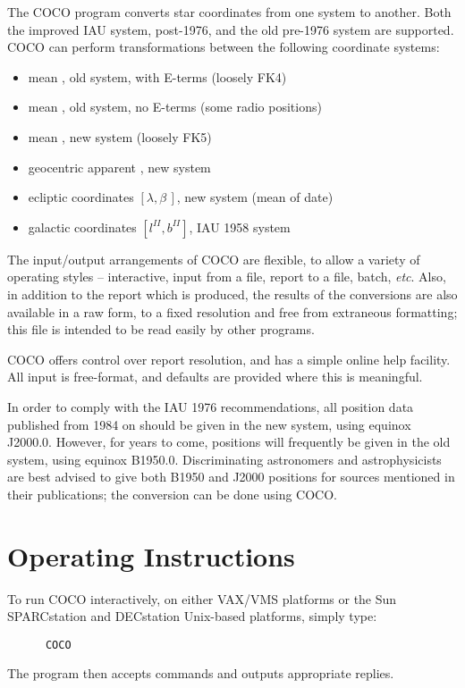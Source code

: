 The COCO program converts star coordinates from one system to
another. Both the improved IAU system, post-1976, and the old pre-1976
system are supported.
COCO can perform transformations between the following
coordinate systems:
\begin{itemize}
\item mean \radec, old system, with E-terms (loosely FK4)
\item mean \radec, old system, no E-terms (some radio positions)
\item mean \radec, new system (loosely FK5)
\item geocentric apparent \radec, new system
\item ecliptic coordinates $[\lambda,\beta\,]$, new system (mean of date)
\item galactic coordinates $[l^{II},b^{II}]$, IAU 1958 system
\end{itemize}
The input/output arrangements of COCO are flexible, to allow
a variety of operating styles -- interactive, input from a file,
report to a file, batch, {\it etc}.
Also, in addition to the report which is produced, the results of the
conversions are also available in a raw form, to a fixed resolution
and free from extraneous formatting; this file is intended
to be read easily by other programs.

COCO offers control over report resolution, and has a simple online help
facility.
All input is free-format, and defaults are provided where this
is meaningful.

In order to comply with the IAU 1976 recommendations, all
position data published from 1984 on should be given in
the new system, using equinox J2000.0.
However, for years to come, positions will frequently be given in
the old system, using equinox B1950.0.
Discriminating astronomers and astrophysicists are best
advised to give both B1950 and J2000
positions for sources mentioned in their publications; the
conversion can be done using COCO.

\section{Operating Instructions}
To run COCO interactively, on either VAX/VMS platforms or
the Sun SPARCstation and DECstation Unix-based platforms, simply type:
\begin{verbatim}
      COCO
\end{verbatim}
The program then accepts commands and outputs appropriate replies.


